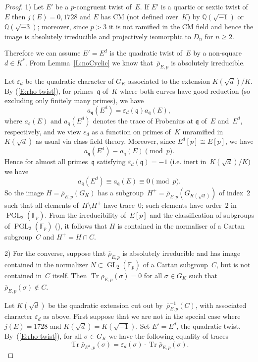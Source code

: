 \documentclass[12pt, reqno]{amsart}
\newcommand{\F}{\mathbb{F}}
\newcommand{\Q}{\mathbb{Q}}
\newcommand{\rhobar}{{\overline{\rho}}}
\newcommand{\frq}{{\mathfrak q}}
\newcommand{\eps}{\varepsilon}
\DeclareMathOperator{\Tr}{Tr}
\newcommand{\GL}{\operatorname{GL}}
\newcommand{\PGL}{\operatorname{PGL}}
\numberwithin{equation}{section}
\theoremstyle{definition}
\theoremstyle{remark}
\begin{document}
\begin{proof} 1) Let $E'$ be a $p$-congruent twist of~$E$. If $E'$ is a quartic or sextic twist of~$E$ then $j(E)=0,1728$ and $E$ has CM (not defined over~$K$) by $\Q(\sqrt{-1})$ or
  $\Q(\sqrt{-3})$; moreover, since $p > 3$ it is not ramified in the
  CM field and hence the image is absolutely irreducible and
  projectively isomorphic to $D_n$ for $n \geq 2$.

Therefore we can assume $E' = E^d$ is the quadratic twist of~$E$ by a
non-square $d\in K^*$.  From Lemma~\ref{L:noCyclic} we know
that~$\rhobar_{E,p}$ is absolutely irreducible.

Let $\eps_d$ be the quadratic character of $G_K$ associated to the
extension $K(\sqrt{d})/K$. By (\ref{E:rho-twist}), for primes~$\frq$
of~$K$ where both curves have good reduction (so excluding only
finitely many primes), we have
\[
  a_\frq(E^d) = \eps_d(\frq) a_\frq(E),
\]
where $a_\frq(E)$ and $a_\frq(E^d)$ denotes the trace of Frobenius at
$\frq$ of~$E$ and~$E^d$, respectively, and we view $\eps_d$ as a
function on primes of~$K$ unramified in~$K(\sqrt{d})$ as usual via
class field theory.  Moreover, since $E^d[p]\cong E[p]$, we have
\[
  a_\frq(E^d) \equiv a_\frq(E) \pmod{p}.
\]
Hence for almost all primes~$\frq$ satisfying $\eps_d(\frq) = -1$
(i.e. inert in~$K(\sqrt{d})/K$) we have
\[
  a_\frq(E^d) \equiv a_\frq(E) \equiv0 \pmod{p}.
\]
So the image $H=\rhobar_{E,p}(G_K)$ has a
subgroup~$H^+=\rhobar_{E,p}(G_{K(\sqrt{d})})$ of index~$2$ such that
all elements of~$H\setminus H^+$ have trace~$0$; such elements have
order~$2$ in $\PGL_2(\F_p)$. From the irreducibility of~$E[p]$ and the
classification of subgroups of $\PGL_2(\F_p)$ (\cite[Theorem
  XI.2.3]{LangModForms}), it follows that $H$ is contained in the
normaliser of a Cartan subgroup~$C$ and $H^+=H\cap C$.

2) For the converse, suppose that $\rhobar_{E,p}$ is absolutely irreducible and has image contained in
the normalizer $N \subset \GL_2(\F_p)$ of a Cartan subgroup~$C$, but
is not contained in~$C$ itself. Then $\Tr \rhobar_{E,p}(\sigma) = 0$
for all $\sigma \in G_K$ such that $\rhobar_{E,p}(\sigma) \not\in C$.

Let $K(\sqrt{d})$ be the quadratic extension cut out
by~$\rhobar_{E,p}^{-1}(C)$, with associated character $\eps_d$ as
above.  First suppose that we are not in the special case where
$j(E)=1728$ and $K(\sqrt{d})=K(\sqrt{-1})$.  Set $E'=E^d$, the
quadratic twist.  By~(\ref{E:rho-twist}), for all $\sigma \in G_K$ we
have the following equality of traces
\[\Tr \rhobar_{{E^d},p}(\sigma) = \eps_d(\sigma) \cdot \Tr \rhobar_{E,p}(\sigma).\]


\end{proof}
\end{document}
